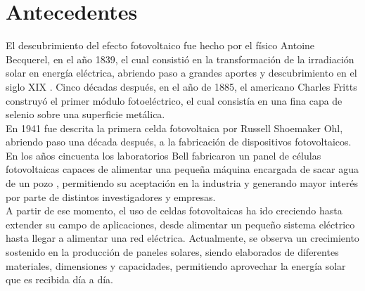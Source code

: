 \section{Antecedentes}
El descubrimiento del efecto fotovoltaico fue hecho por el físico Antoine Becquerel, en el año 1839, el cual consistió en la transformación de la irradiación solar en energía eléctrica, abriendo paso a grandes aportes y descubrimiento en el siglo XIX \cite{I14}. Cinco décadas después, en el año de 1885, el americano Charles Fritts construyó el primer módulo fotoeléctrico, el cual consistía en una fina capa de selenio sobre una superficie metálica.\\

En 1941 fue descrita la primera celda fotovoltaica por Russell Shoemaker Ohl, abriendo paso una década después, a la fabricación de dispositivos fotovoltaicos. En los años cincuenta los laboratorios Bell fabricaron un panel de células fotovoltaicas capaces de alimentar una pequeña máquina encargada de sacar agua de un pozo \cite{I15:2007:Online}, permitiendo su aceptación en la industria y generando mayor interés por parte de distintos investigadores y empresas.\\

A partir de ese momento, el uso de celdas fotovoltaicas ha ido creciendo hasta extender su campo de aplicaciones, desde alimentar un pequeño sistema eléctrico hasta llegar a alimentar una red eléctrica. Actualmente, se observa un crecimiento sostenido en la producción de paneles solares, siendo elaborados de diferentes materiales, dimensiones y capacidades, permitiendo aprovechar la energía solar que es recibida día a día.


